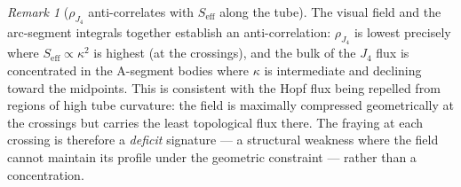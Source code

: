 \documentclass[11pt,a4paper]{article}
\theoremstyle{definition}\newtheorem{definition}[theorem]{Definition}
\theoremstyle{remark}
\newtheorem{remark}[theorem]{Remark}
\theoremstyle{definition}\newtheorem{construction}[theorem]{Construction}
\begin{document}
\begin{remark}[$\rho_{J_4}$ anti-correlates with $S_{\mathrm{eff}}$ along the tube]
\label{P16:rem:rhoJ4_anticorrelation}
The visual field and the arc-segment integrals together establish an 
anti-correlation: $\rho_{J_4}$ is lowest precisely where
$S_{\mathrm{eff}}\propto\kappa^2$ is highest (at the crossings), and
the bulk of the $J_4$ flux is concentrated in the A-segment bodies
where $\kappa$ is intermediate and declining toward the midpoints.
This is consistent with the Hopf flux being repelled from regions of
high tube curvature: the field is maximally compressed geometrically
at the crossings but carries the least topological flux there.  The
fraying at each crossing is therefore a \emph{deficit} signature ---
a structural weakness where the field cannot maintain its profile under
the geometric constraint --- rather than a concentration.
\end{remark}
\end{document}
